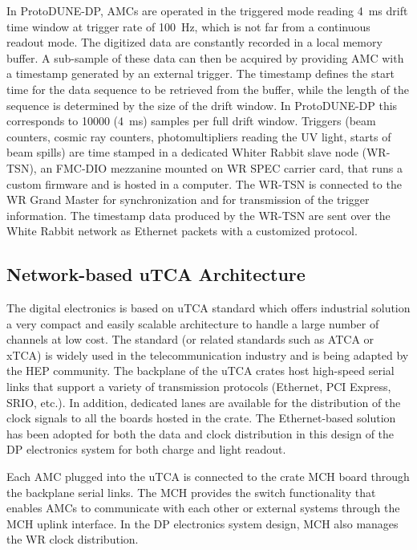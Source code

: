 In ProtoDUNE-DP, AMCs are operated in the triggered mode reading \SI{4}{\milli\second} drift time window at trigger rate of \SI{100}{Hz}, which is not far from a continuous readout mode. The digitized data are constantly recorded in a local memory buffer. A sub-sample of these data can then be acquired by providing AMC with a timestamp generated by an external trigger. The timestamp defines the start time for the data sequence to be retrieved from the buffer, while the length of the sequence is determined by the size of the drift window. In ProtoDUNE-DP this corresponds to \num{10000} (\SI{4}{\milli\second}) samples per full drift window.  Triggers (beam counters, cosmic ray counters, photomultipliers reading the UV light, starts of beam spills) are time stamped in a dedicated Whiter Rabbit slave node (WR-TSN), an FMC-DIO mezzanine mounted on WR SPEC carrier card, that runs a custom firmware and is hosted in a computer. The WR-TSN is connected to the WR Grand Master for synchronization and for transmission of the trigger information. The timestamp data produced by the WR-TSN are sent over the White Rabbit network as Ethernet packets with a customized protocol. 
   
\subsection{Network-based uTCA Architecture}
\label{sec:fddp-tpc-elec-design-utca}

The digital electronics is based on uTCA standard which offers industrial solution a very compact and easily scalable architecture to handle a large number of channels at low cost.  The standard (or related standards such as ATCA or xTCA) is widely used in the telecommunication industry and is being adapted by the HEP community. The backplane of the uTCA crates host high-speed serial links that support a variety of transmission protocols (Ethernet, PCI Express, SRIO, etc.). In addition, dedicated lanes are available for the distribution of the clock signals to all the boards hosted in the crate.  The Ethernet-based solution has been adopted for both the data and clock distribution in this design of the DP electronics system for both charge and light readout. 

Each AMC plugged into the uTCA is connected to the crate MCH board through the backplane serial links. The MCH provides the switch functionality that enables AMCs to communicate with each other or external systems through the MCH uplink interface. In the DP electronics system design, MCH also manages the WR clock distribution. 

